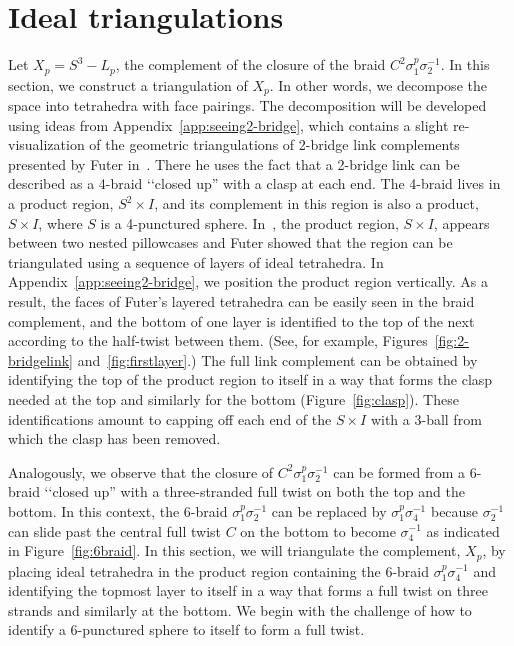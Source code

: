 \documentclass[reqno]{amsart}
\theoremstyle{plain}
\theoremstyle{definition}
\begin{document}
\section{Ideal triangulations}  \label{sec:idealtriangulationsq=1}

Let $X_{p}=S^3-L_p$, the complement of the closure of the braid $C^2\sigma_1^p\sigma_2^{-1}$.  In this section, we construct a triangulation of $X_{p}$.  In other words, we decompose the space into tetrahedra with face pairings. The decomposition will be developed using ideas from Appendix~\ref{app:seeing2-bridge}, which contains a slight re-visualization of the geometric triangulations of 2-bridge link complements presented by Futer in~\cite[Appendix]{GwithF2Bridge}.  There he uses the fact that a 2-bridge link can be described as a 4-braid \lq\lq closed up'' with a clasp at each end.  The 4-braid lives in a product region, $S^2\times I$, and its complement in this region is also a product, $S\times I$, where $S$ is a 4-punctured sphere. In~\cite[Appendix]{GwithF2Bridge}, the product region, $S\times I$, appears between two nested pillowcases and Futer showed that the region can be triangulated using a sequence of layers of ideal tetrahedra.  In Appendix~\ref{app:seeing2-bridge}, we position the product region vertically.  As a result, the faces of Futer's layered tetrahedra can be easily seen in the braid complement, and the bottom of one layer is identified to the top of the next according to the half-twist between them.  (See, for example, Figures~\ref{fig:2-bridgelink} and~\ref{fig:firstlayer}.)  The full link complement can  be obtained by identifying the top of the product region to itself in a way that forms the  clasp needed at the top and similarly for the bottom (Figure~\ref{fig:clasp}).  These identifications amount to capping off each end of the $S\times I$ with a 3-ball from which the clasp has been removed.

Analogously, we observe that the closure of $C^2\sigma_1^p\sigma_2^{-1}$ can  be formed from a 6-braid \lq\lq closed up'' with a three-stranded full twist on both the top and the bottom.  In this context, the 6-braid $\sigma_1^p\sigma_2^{-1}$ can be replaced by $\sigma_1^p\sigma_4^{-1}$ because $\sigma_2^{-1}$ can slide past the central full twist $C$ on the bottom to become $\sigma_4^{-1}$ as indicated in Figure~\ref{fig:6braid}.  In this section, we will triangulate the complement, $X_{p}$, by placing ideal tetrahedra in the product region containing the 6-braid $\sigma_1^p\sigma_4^{-1}$ and identifying the topmost layer to itself in a way that forms a full twist on three strands and similarly at the bottom.  We begin with the challenge of how to identify a 6-punctured sphere to itself to form a full twist.
\end{document}
